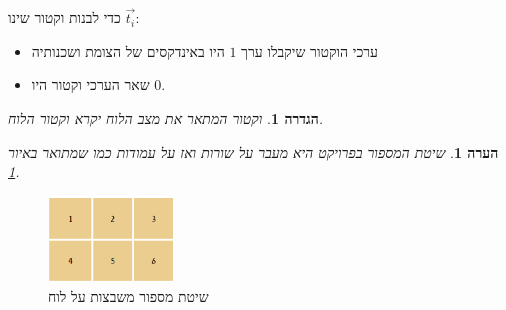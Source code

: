 \documentclass[12pt,leqno]{article}
\theoremstyle{theoremdd}
\newtheorem{definition}{הגדרה}[section]
\newtheorem{comm}{הערה}[section]
\begin{document}
כדי לבנות וקטור שינו 
$\vec{t_i}$:
\begin{itemize}
    \item 
    ערכי הוקטור שיקבלו ערך
    $1$
    היו באינדקסים 
    של הצומת 
    ושכנותיה
    \item 
    שאר הערכי וקטור 
    היו 
    $0$.
\end{itemize}
\begin{definition}
    \label{def:board-vector}
    וקטור המתאר את מצב הלוח יקרא וקטור הלוח.
\end{definition}
\begin{comm}
    \label{ comm: indexing board game}
    שיטת המספור בפרויקט 
    היא מעבר 
    על שורות ואז על עמודות כמו שמתואר באיור
    \ref{fig:numbering_board_2x2}.
\end{comm}
\begin{figure}[ht]
    \caption{שיטת מספור משבצות על לוח}
    \label{fig:numbering_board_2x2}
    \centering
    \includegraphics[width=0.3\textwidth,keepaspectratio]{images/2x3_board.PNG}
\end{figure}
\end{document}
